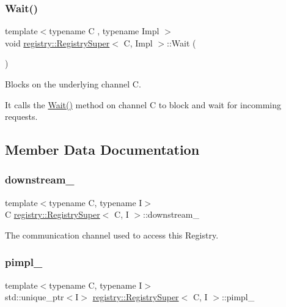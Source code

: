 \subsubsection{\texorpdfstring{Wait()}{Wait()}}
{\footnotesize\ttfamily template$<$typename C , typename Impl $>$ \\
void \hyperlink{classregistry_1_1RegistrySuper}{registry\+::\+Registry\+Super}$<$ C, Impl $>$\+::Wait (\begin{DoxyParamCaption}{ }\end{DoxyParamCaption})}



Blocks on the underlying channel C. 

It calls the \hyperlink{classregistry_1_1RegistrySuper_a4fce4d869236f2b99e8d461311facc76}{Wait()} method on channel C to block and wait for incomming requests. 

\subsection{Member Data Documentation}
\mbox{\label{classregistry_1_1RegistrySuper_ab4dfb36336cfcaacaf0ab923e1d53485}} 
\subsubsection{\texorpdfstring{downstream\+\_\+}{downstream\_}}
{\footnotesize\ttfamily template$<$typename C, typename I$>$ \\
C \hyperlink{classregistry_1_1RegistrySuper}{registry\+::\+Registry\+Super}$<$ C, I $>$\+::downstream\+\_\+\hspace{0.3cm}{\ttfamily [private]}}



The communication channel used to access this Registry. 

\mbox{\label{classregistry_1_1RegistrySuper_a0fd137444c6ca161cf7199bf0d25ab3c}} 
\subsubsection{\texorpdfstring{pimpl\+\_\+}{pimpl\_}}
{\footnotesize\ttfamily template$<$typename C, typename I$>$ \\
std\+::unique\+\_\+ptr$<$I$>$ \hyperlink{classregistry_1_1RegistrySuper}{registry\+::\+Registry\+Super}$<$ C, I $>$\+::pimpl\+\_\+\hspace{0.3cm}{\ttfamily [private]}}



